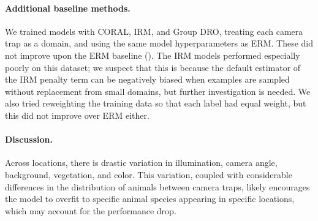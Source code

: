 \paragraph{Additional baseline methods.}
\begin{table}[tbp]
  \caption{Baseline results on \iWildCam. In-distribution (ID) results correspond to the train-to-train setting. Parentheses show standard deviation across 3 replicates.}\label{tab:results_iwildcam}
  \centering
\end{table}
We trained models with CORAL, IRM, and Group DRO, treating each camera trap as a domain, and using the same model hyperparameters as ERM.
These did not improve upon the ERM baseline ().
The IRM models performed especially poorly on this dataset; we suspect that this is because the default estimator of the IRM penalty term can be negatively biased when examples are sampled without replacement from small domains, but further investigation is needed.
We also tried reweighting the training data so that each label had equal weight, but this did not improve over ERM either. 

\paragraph{Discussion.}
Across locations, there is drastic variation in illumination, camera angle, background, vegetation, and color. This variation, coupled with considerable differences in the distribution of animals between camera traps, likely encourages the model to overfit to specific animal species appearing in specific locations, which may account for the performance drop.

